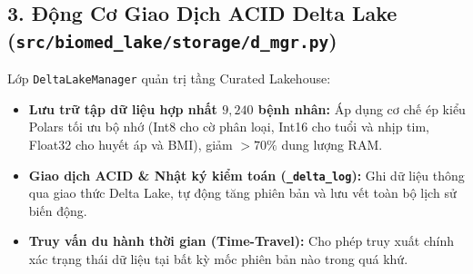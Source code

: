 \documentclass[11pt,a4paper]{article}
\begin{document}
\subsection{3. Động Cơ Giao Dịch ACID Delta Lake (\texttt{src/biomed_lake/storage/d_mgr.py})}
Lớp \texttt{DeltaLakeManager} quản trị tầng Curated Lakehouse:
\begin{itemize}
    \item \textbf{Lưu trữ tập dữ liệu hợp nhất $9{,}240$ bệnh nhân:} Áp dụng cơ chế ép kiểu Polars tối ưu bộ nhớ (Int8 cho cờ phân loại, Int16 cho tuổi và nhịp tim, Float32 cho huyết áp và BMI), giảm $>70\%$ dung lượng RAM.
    \item \textbf{Giao dịch ACID \& Nhật ký kiểm toán (\texttt{\_delta\_log}):} Ghi dữ liệu thông qua giao thức Delta Lake, tự động tăng phiên bản và lưu vết toàn bộ lịch sử biến động.
    \item \textbf{Truy vấn du hành thời gian (Time-Travel):} Cho phép truy xuất chính xác trạng thái dữ liệu tại bất kỳ mốc phiên bản nào trong quá khứ.
\end{itemize}
\end{document}

